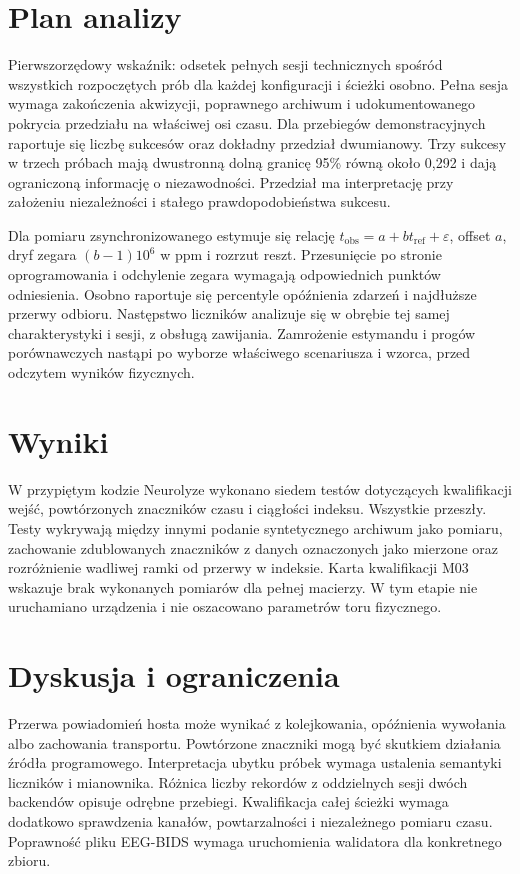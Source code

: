 \documentclass[11pt,a4paper]{article}
\begin{document}
\section{Plan analizy}
Pierwszorzędowy wskaźnik: odsetek pełnych sesji technicznych spośród wszystkich rozpoczętych prób dla każdej konfiguracji i ścieżki osobno. Pełna sesja wymaga zakończenia akwizycji, poprawnego archiwum i udokumentowanego pokrycia przedziału na właściwej osi czasu. Dla przebiegów demonstracyjnych raportuje się liczbę sukcesów oraz dokładny przedział dwumianowy. Trzy sukcesy w trzech próbach mają dwustronną dolną granicę 95\% równą około 0,292 i dają ograniczoną informację o niezawodności. Przedział ma interpretację przy założeniu niezależności i stałego prawdopodobieństwa sukcesu.

Dla pomiaru zsynchronizowanego estymuje się relację $t_\mathrm{obs}=a+b t_\mathrm{ref}+\varepsilon$, offset $a$, dryf zegara $(b-1)10^6$ w ppm i rozrzut reszt. Przesunięcie po stronie oprogramowania i odchylenie zegara wymagają odpowiednich punktów odniesienia. Osobno raportuje się percentyle opóźnienia zdarzeń i najdłuższe przerwy odbioru. Następstwo liczników analizuje się w obrębie tej samej charakterystyki i sesji, z obsługą zawijania. Zamrożenie estymandu i progów porównawczych nastąpi po wyborze właściwego scenariusza i wzorca, przed odczytem wyników fizycznych.

\section{Wyniki}
W przypiętym kodzie Neurolyze wykonano siedem testów dotyczących kwalifikacji wejść, powtórzonych znaczników czasu i ciągłości indeksu. Wszystkie przeszły. Testy wykrywają między innymi podanie syntetycznego archiwum jako pomiaru, zachowanie zdublowanych znaczników z danych oznaczonych jako mierzone oraz rozróżnienie wadliwej ramki od przerwy w indeksie. Karta kwalifikacji M03 wskazuje brak wykonanych pomiarów dla pełnej macierzy. W tym etapie nie uruchamiano urządzenia i nie oszacowano parametrów toru fizycznego.

\section{Dyskusja i ograniczenia}
Przerwa powiadomień hosta może wynikać z kolejkowania, opóźnienia wywołania albo zachowania transportu. Powtórzone znaczniki mogą być skutkiem działania źródła programowego. Interpretacja ubytku próbek wymaga ustalenia semantyki liczników i mianownika. Różnica liczby rekordów z oddzielnych sesji dwóch backendów opisuje odrębne przebiegi. Kwalifikacja całej ścieżki wymaga dodatkowo sprawdzenia kanałów, powtarzalności i niezależnego pomiaru czasu. Poprawność pliku EEG-BIDS wymaga uruchomienia walidatora dla konkretnego zbioru.


\end{document}
